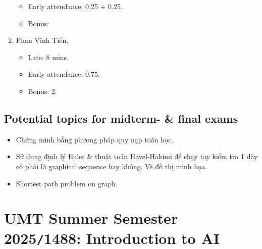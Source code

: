 \documentclass{article}
\begin{document}
\begin{enumerate}
	\begin{itemize}
		\item Early attendance: 0.25 + 0.25.
		\item Bonus: 
	\end{itemize}
	\item {\sc Phan Vĩnh Tiến.}
	\begin{itemize}
		\item Late: 8 mins.
		\item Early attendance: 0.75.
		\item Bonus: 2.
	\end{itemize}
\end{enumerate}


\subsection{Potential topics for midterm- \& final exams}

\begin{itemize}
	\item Chứng minh bằng phương pháp quy nạp toán học.
	\item Sử dụng định lý Euler \& thuật toán Havel-Hakimi để chạy tay kiểm tra 1 dãy có phải là graphical sequence hay không. Vẽ đồ thị minh họa.
	\item Shortest path problem on graph.
\end{itemize}


\section{UMT Summer Semester 2025{\tt/}1488: Introduction to AI}
\end{document}
